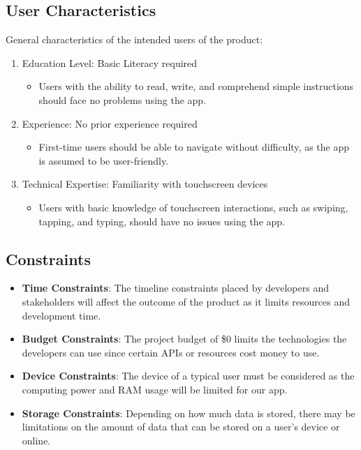 \documentclass{article}
\begin{document}
\subsection{User Characteristics}
\label{sub:user_characteristics}
General characteristics of the intended users of the product:
\begin{enumerate}
	\item Education Level: Basic Literacy required
	\begin{itemize}
		\item Users with the ability to read, write, and comprehend simple instructions should face no problems using the app.
	\end{itemize}
	\item Experience: No prior experience required
	\begin{itemize}
		\item First-time users should be able to navigate without difficulty, as the app is assumed to be user-friendly.
	\end{itemize}
	\item Technical Expertise: Familiarity with touchscreen devices
	\begin{itemize}
		\item Users with basic knowledge of touchscreen interactions, such as swiping, tapping, and typing, should have no issues using the app.
	\end{itemize}
\end{enumerate}

\subsection{Constraints}
\label{sub:constraints}
\begin{itemize}
    \item \textbf{Time Constraints}: The timeline constraints placed by developers and stakeholders will affect the outcome of the product as it limits resources and development time.
    \item \textbf{Budget Constraints}: The project budget of \$0 limits the technologies the developers can use since certain APIs or resources cost money to use.
    \item \textbf{Device Constraints}: The device of a typical user must be considered as the computing power and RAM usage will be limited for our app.
    \item \textbf{Storage Constraints}: Depending on how much data is stored, there may be limitations on the amount of data that can be stored on a user’s device or online.
\end{itemize}
\end{document}
